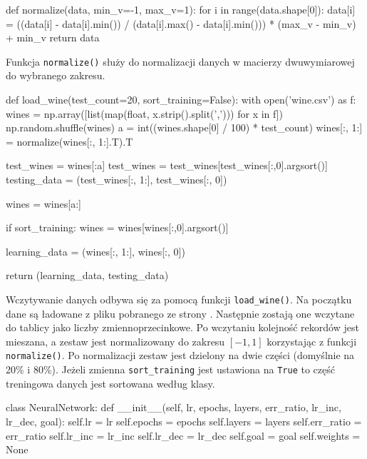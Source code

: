 \documentclass[a4paper,12pt]{article}
\numberwithin{equation}{section}
\begin{document}
\begin{pythoncode}
def normalize(data, min_v=-1, max_v=1):
    for i in range(data.shape[0]):
        data[i] = ((data[i] - data[i].min()) / (data[i].max() - data[i].min())) * (max_v - min_v) + min_v
    return data
\end{pythoncode}

\noindent Funkcja \texttt{normalize()} służy do normalizacji danych w macierzy dwuwymiarowej do wybranego zakresu.


\begin{pythoncode}
def load_wine(test_count=20, sort_training=False):
    with open('wine.csv') as f:
        wines = np.array([list(map(float, x.strip().split(','))) for x in f])
        np.random.shuffle(wines)
        a = int((wines.shape[0] / 100) * test_count)
        wines[:, 1:] = normalize(wines[:, 1:].T).T

        test_wines = wines[:a]
        test_wines = test_wines[test_wines[:,0].argsort()]
        testing_data = (test_wines[:, 1:], test_wines[:, 0])

        wines = wines[a:]
        
        if sort_training:
            wines = wines[wines[:,0].argsort()]
        
        learning_data = (wines[:, 1:], wines[:, 0])
    
    return (learning_data, testing_data)
\end{pythoncode}

\noindent Wczytywanie danych odbywa się za pomocą funkcji \texttt{load_wine()}. Na początku dane są ładowane z pliku pobranego ze strony \cite{dataset}. Następnie zostają one wczytane do tablicy jako liczby zmiennoprzecinkowe. Po wczytaniu kolejność rekordów jest mieszana, a zestaw jest normalizowany do zakresu $[-1, 1]$ korzystając z funkcji \texttt{normalize()}. Po normalizacji zestaw jest dzielony na dwie części (domyślnie na 20\% i 80\%). Jeżeli zmienna \texttt{sort_training} jest ustawiona na \texttt{True} to część treningowa danych jest sortowana według klasy.


\begin{pythoncode}
class NeuralNetwork:
    def __init__(self, lr, epochs, layers, err_ratio, lr_inc, lr_dec, goal):
        self.lr = lr
        self.epochs = epochs
        self.layers = layers
        self.err_ratio = err_ratio
        self.lr_inc = lr_inc
        self.lr_dec = lr_dec
        self.goal = goal
        self.weights = None
\end{pythoncode}
\end{document}
